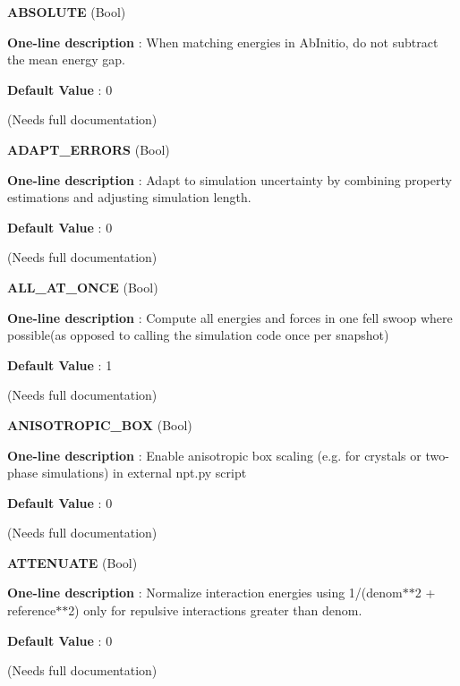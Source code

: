 \begin{DoxyItemize}
\item {\bfseries  A\-B\-S\-O\-L\-U\-T\-E } (Bool) \par
{\bfseries  One-\/line description }\-: When matching energies in Ab\-Initio, do not subtract the mean energy gap. \par
{\bfseries  Default Value }\-: 0 \par
(Needs full documentation)\end{DoxyItemize}
\begin{DoxyItemize}
\item {\bfseries  A\-D\-A\-P\-T\-\_\-\-E\-R\-R\-O\-R\-S } (Bool) \par
{\bfseries  One-\/line description }\-: Adapt to simulation uncertainty by combining property estimations and adjusting simulation length. \par
{\bfseries  Default Value }\-: 0 \par
(Needs full documentation)\end{DoxyItemize}
\begin{DoxyItemize}
\item {\bfseries  A\-L\-L\-\_\-\-A\-T\-\_\-\-O\-N\-C\-E } (Bool) \par
{\bfseries  One-\/line description }\-: Compute all energies and forces in one fell swoop where possible(as opposed to calling the simulation code once per snapshot) \par
{\bfseries  Default Value }\-: 1 \par
(Needs full documentation)\end{DoxyItemize}
\begin{DoxyItemize}
\item {\bfseries  A\-N\-I\-S\-O\-T\-R\-O\-P\-I\-C\-\_\-\-B\-O\-X } (Bool) \par
{\bfseries  One-\/line description }\-: Enable anisotropic box scaling (e.\-g. for crystals or two-\/phase simulations) in external npt.\-py script \par
{\bfseries  Default Value }\-: 0 \par
(Needs full documentation)\end{DoxyItemize}
\begin{DoxyItemize}
\item {\bfseries  A\-T\-T\-E\-N\-U\-A\-T\-E } (Bool) \par
{\bfseries  One-\/line description }\-: Normalize interaction energies using 1/(denom$\ast$$\ast$2 + reference$\ast$$\ast$2) only for repulsive interactions greater than denom. \par
{\bfseries  Default Value }\-: 0 \par
(Needs full documentation)\end{DoxyItemize}
